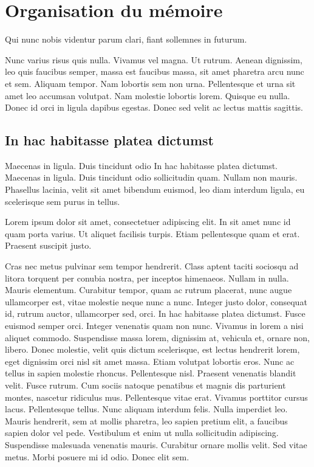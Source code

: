 \documentclass[../hdr.tex]{subfiles}
\begin{document}
\bigskip 

\section*{Organisation du mémoire}

Qui nunc nobis videntur parum clari, fiant sollemnes in futurum.

Nunc varius risus quis nulla. Vivamus vel magna. Ut rutrum. Aenean dignissim,
leo quis faucibus semper, massa est faucibus massa, sit amet pharetra arcu nunc
et sem. Aliquam tempor. Nam lobortis sem non urna. Pellentesque et urna sit amet
leo accumsan volutpat. Nam molestie lobortis lorem. Quisque eu nulla. Donec id
orci in ligula dapibus egestas. Donec sed velit ac lectus mattis sagittis.

\subsection*{In hac habitasse platea dictumst}

Maecenas in ligula. Duis tincidunt odio
In hac habitasse platea dictumst. Maecenas in ligula. Duis tincidunt odio
sollicitudin quam. Nullam non mauris. Phasellus lacinia, velit sit amet bibendum
euismod, leo diam interdum ligula, eu scelerisque sem purus in tellus.

Lorem ipsum dolor sit amet, consectetuer adipiscing elit. In sit amet nunc id
quam porta varius. Ut aliquet facilisis turpis. Etiam pellentesque quam et erat.
Praesent suscipit justo.

Cras nec metus pulvinar sem tempor hendrerit. Class aptent taciti sociosqu ad
litora torquent per conubia nostra, per inceptos himenaeos. Nullam in nulla.
Mauris elementum. Curabitur tempor, quam ac rutrum placerat, nunc augue
ullamcorper est, vitae molestie neque nunc a nunc. Integer justo dolor,
consequat id, rutrum auctor, ullamcorper sed, orci. In hac habitasse platea
dictumst. Fusce euismod semper orci. Integer venenatis quam non nunc. Vivamus in
lorem a nisi aliquet commodo. Suspendisse massa lorem, dignissim at, vehicula
et, ornare non, libero. Donec molestie, velit quis dictum scelerisque, est
lectus hendrerit lorem, eget dignissim orci nisl sit amet massa. Etiam volutpat
lobortis eros. Nunc ac tellus in sapien molestie rhoncus. Pellentesque nisl.
Praesent venenatis blandit velit. Fusce rutrum. Cum sociis natoque penatibus et
magnis dis parturient montes, nascetur ridiculus mus. Pellentesque vitae erat.
Vivamus porttitor cursus lacus. Pellentesque tellus. Nunc aliquam interdum
felis. Nulla imperdiet leo. Mauris hendrerit, sem at mollis pharetra, leo sapien
pretium elit, a faucibus sapien dolor vel pede. Vestibulum et enim ut nulla
sollicitudin adipiscing. Suspendisse malesuada venenatis mauris. Curabitur
ornare mollis velit. Sed vitae metus. Morbi posuere mi id odio. Donec elit sem.
\end{document}
